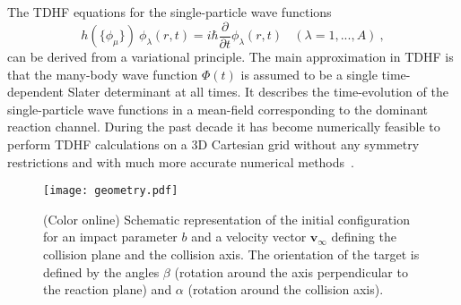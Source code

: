 \documentclass[reprint,aps,prc,twocolumn,floatfix,10pt]{revtex4-2}
\begin{document}
The TDHF equations for the single-particle wave functions
\begin{equation}
h(\{\phi_{\mu}\}) \ \phi_{\lambda} (r,t) = i \hbar \frac{\partial}{\partial t} \phi_{\lambda} (r,t)
            \ \ \ \ (\lambda = 1,...,A) \ ,
\label{eq:TDHF}
\end{equation}
can be derived from a variational principle. The main approximation in TDHF is
that the many-body wave function $\Phi(t)$  is assumed to be a single time-dependent
Slater determinant at all times. It describes the time-evolution of the single-particle
wave functions in a mean-field corresponding to the dominant reaction channel.
During the past decade it has become numerically feasible to perform TDHF calculations on a
3D Cartesian grid without any symmetry restrictions
and with much more accurate numerical methods~\cite{bottcher1989,umar2006c,sekizawa2013,maruhn2014}.
\begin{figure}[!htb]
\centerline{\texttt{[image: geometry.pdf]}}
\caption{\protect(Color online) Schematic representation of the initial configuration for an impact parameter $b$ and  a velocity vector $\mathbf{v}_\infty$ defining the collision plane and the collision axis. The orientation of the target is defined by the angles $\beta$ (rotation around the axis perpendicular to the reaction plane) and $\alpha$ (rotation around the collision axis).}
\label{fig:geometry}
\end{figure}
\end{document}
